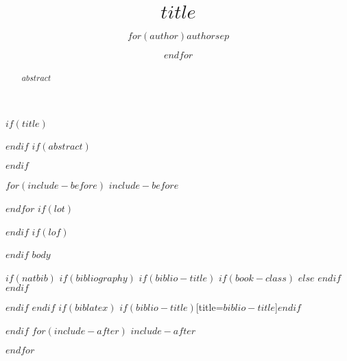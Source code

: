\documentclass[$if(fontsize)$$fontsize$,$endif$$if(lang)$$lang$,$endif$$if(papersize)$$papersize$,$endif$$for(classoption)$$classoption$$sep$,$endfor$]{$documentclass$}
\title{$title$}
\author{$for(author)$$author$$sep$ \and $endfor$}
\date{}
\begin{document}
$if(title)$
\begin{titlepage}
\maketitle
\thispagestyle{empty}
\end{titlepage}
$endif$
$if(abstract)$
\begin{abstract}
$abstract$
\end{abstract}
$endif$

$for(include-before)$
$include-before$


$endfor$
\hypersetup{linkcolor=black}
\setcounter{tocdepth}{$toc-depth$}
\tableofcontents
\newpage
$if(lot)$
\listoftables
$endif$
$if(lof)$
\listoffigures
$endif$
$body$

$if(natbib)$
$if(bibliography)$
$if(biblio-title)$
$if(book-class)$
\renewcommand\bibname{$biblio-title$}
$else$
\renewcommand\refname{$biblio-title$}
$endif$
$endif$


$endif$
$endif$
$if(biblatex)$
\printbibliography$if(biblio-title)$[title=$biblio-title$]$endif$

$endif$
$for(include-after)$
$include-after$

$endfor$
\end{document}
